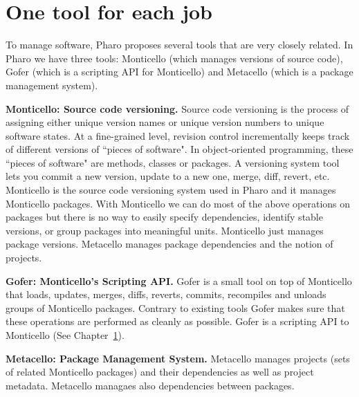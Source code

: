 \documentclass[a4paper,10pt,twoside]{book}
\begin{document}

\section{One tool for each job}

To manage software, Pharo proposes several tools that are very closely related. In Pharo we have three tools: Monticello (which manages versions of source code), Gofer (which is a scripting API for Monticello) and Metacello (which is a package management system).



\begin{description}

\item{\textbf{Monticello: Source code versioning.}}
Source code versioning is the process of assigning either unique version names or unique version numbers to unique software states. At a fine-grained level, revision control incrementally keeps track of different versions of ``pieces of software". In object-oriented programming, these ``pieces of software" are methods, classes or packages. A versioning system tool lets you commit a new version, update to a new one, merge, diff, revert, etc. Monticello is the source code versioning system used in Pharo and it manages Monticello packages. With Monticello we can do most of the above operations on packages but there is no way to easily specify dependencies, identify stable versions, or group packages into meaningful units.  Monticello just manages package versions. Metacello manages package dependencies and the notion of projects.

\item {\textbf{Gofer: Monticello's Scripting API.}}
Gofer is a small tool on top of Monticello that loads, updates, merges, diffs, reverts, commits, recompiles and unloads groups of Monticello packages. Contrary to existing tools Gofer makes sure that these operations are performed as cleanly as possible. Gofer is a scripting API to Monticello (See Chapter~\ref{}).


\item{\textbf{Metacello: Package Management System.}} Metacello manages projects (sets of related Monticello packages) and their dependencies as well as project metadata. Metacello managaes also dependencies between packages.
\end{description}
\end{document}
